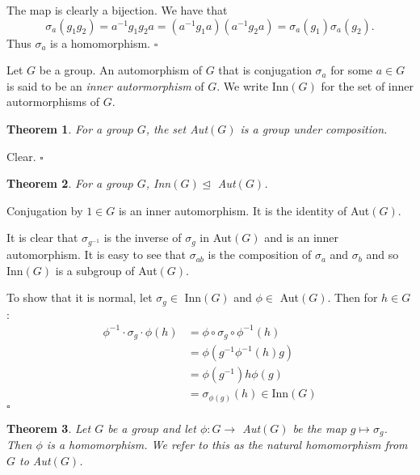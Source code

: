 \documentclass[10pt]{article}
\newtheorem{theorem}{Theorem}[section]
\newenvironment{proof}[1][Proof]{\begin{trivlist}
\item[\hskip \labelsep {\itshape #1}]}{\end{trivlist}}
\newenvironment{definition}[1][Definition]{\begin{trivlist}
\item[\hskip \labelsep {\bfseries #1}]}{\end{trivlist}}
\begin{document}
\begin{proof}
The map is clearly a bijection. We have that
$$\sigma_a(g_1g_2) = a^{-1}g_1g_2a = (a^{-1}g_1a)(a^{-1}g_2a) = \sigma_a(g_1)\sigma_a(g_2).$$
Thus $\sigma_a$ is a homomorphism. $\square$
\end{proof}

\begin{definition}
Let $G$ be a group. An automorphism of $G$ that is conjugation $\sigma_a$ for some $a \in G$ is said to be an \emph{inner autormorphism} of $G$. We write Inn$(G)$ for the set of inner autormorphisms of $G$.
\end{definition}

\begin{theorem}
For a group $G$, the set Aut$(G)$ is a group under composition.
\end{theorem}

\begin{proof}
Clear. $\square$
\end{proof}

\begin{theorem}
For a group $G$, Inn$(G) \mathrel{\unlhd}$ Aut$(G)$.
\end{theorem}

\begin{proof}
Conjugation by $1 \in G$ is an inner automorphism. It is the identity of Aut$(G)$.

It is clear that $\sigma_{g^{-1}}$ is the inverse of $\sigma_g$ in Aut$(G)$ and is an inner automorphism. It is easy to see that $\sigma_{ab}$ is the composition of $\sigma_a$ and $\sigma_b$ and so Inn$(G)$ is a subgroup of Aut$(G)$.

To show that it is normal, let $\sigma_g \in$ Inn$(G)$ and $\phi \in$ Aut$(G)$. Then for $h \in G$:
\begin{align*}
\phi^{-1}\cdot\sigma_g\cdot\phi(h) &= \phi\circ \sigma_g \circ \phi^{-1}(h)\\
                                   &= \phi(g^{-1}\phi^{-1}(h)g)\\
                                   &= \phi(g^{-1})h\phi(g)\\
                                   &= \sigma_{\phi(g)}(h) \in \mbox{Inn}(G)
\end{align*} $\square$
\end{proof}

\begin{theorem}
Let $G$ be a group and let $\phi : G \to$ Aut$(G)$ be the map $g \mapsto \sigma_g$. Then $\phi$ is a homomorphism. We refer to this as the natural homomorphism from $G$ to Aut$(G)$.
\end{theorem}
\end{document}

